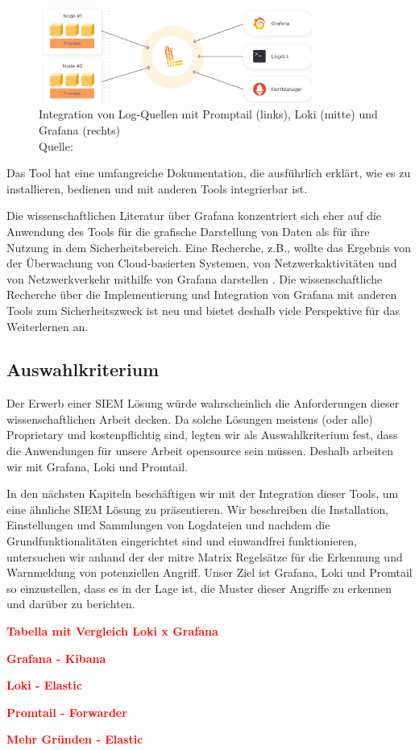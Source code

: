 \begin{figure}[H]
   \centering
   \includegraphics[width=0.8\textwidth]{assets/2_p10.png}
   \caption[Integration von Log-Quellen mit Promptail, Loki und Grafana]
   {Integration von Log-Quellen mit Promptail (links), Loki (mitte) und Grafana (rechts) \\Quelle: \citep{Grafana_Logs}}
   \label{fig:Integration_Loki_Promtail_Grafana}
   \centering
\end{figure}

Das Tool hat eine umfangreiche Dokumentation, die ausführlich erklärt, wie es zu installieren, bedienen und mit anderen Tools integrierbar ist. 

Die wissenschaftlichen Literatur über Grafana konzentriert sich eher auf die Anwendung des Tools für die grafische Darstellung von Daten als für ihre Nutzung in dem Sicherheitsbereich. Eine Recherche, z.B., wollte das Ergebnis von der Überwachung von Cloud-basierten Systemen, von Netzwerkaktivitäten und von Netzwerkverkehr mithilfe von Grafana darstellen \citep{Manases_grafananetwork}. 
Die wissenschaftliche Recherche über die Implementierung und Integration von Grafana mit anderen Tools zum Sicherheitszweck ist neu und bietet deshalb viele  Perspektive für das Weiterlernen an.

\subsection{Auswahlkriterium}
Der Erwerb einer \gls{SIEM} Lösung würde wahrscheinlich die Anforderungen dieser wissenschaftlichen Arbeit decken. Da solche Lösungen meistens (oder alle) \gls{Proprietary} und kostenpflichtig sind, legten wir als Auswahlkriterium fest, dass die Anwendungen für unsere Arbeit \gls{opensource} sein müssen. Deshalb arbeiten wir mit Grafana, Loki und Promtail.

In den nächsten Kapiteln beschäftigen wir mit der Integration dieser Tools, um eine ähnliche \gls{SIEM} Lösung zu präsentieren. Wir beschreiben die Installation, Einstellungen und Sammlungen von Logdateien und nachdem die Grundfunktionalitäten eingerichtet sind und einwandfrei funktionieren, untersuchen wir anhand der  der \gls{mitre} Matrix Regelsätze für die Erkennung und Warnmeldung von potenziellen Angriff. Unser Ziel ist Grafana, Loki und Promtail so einzustellen, dass es in der Lage ist, die Muster dieser Angriffe zu erkennen und darüber zu berichten.


\textbf{\textcolor{red}{Tabella mit Vergleich Loki x Grafana}}

\textbf{\textcolor{red}{Grafana - Kibana}}

\textbf{\textcolor{red}{Loki - Elastic}}

\textbf{\textcolor{red}{Promtail - Forwarder}}

\textbf{\textcolor{red}{Mehr Gründen - Elastic}}